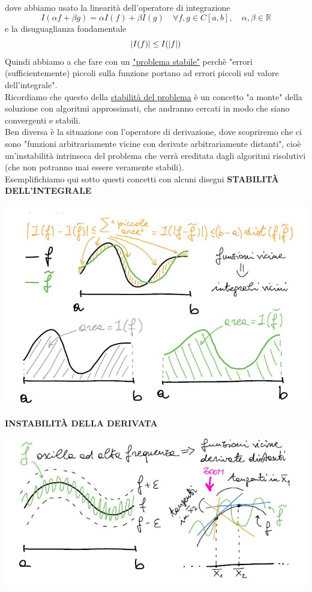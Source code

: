 \documentclass[12pt,a4paper]{article}
\DeclarePairedDelimiter{\abs}{\lvert}{\rvert}
\begin{document}
dove abbiamo usato la linearità dell'operatore di integrazione
\begin{equation*}
        I(\alpha f+\beta g)=\alpha I(f)+\beta I(g)\quad \forall f,g\in C[a,b],\quad \alpha,\beta\in\mathbb{R}
\end{equation*}
e la disuguaglianza fondamentale
\begin{equation*}
    \abs*{I(f)} \leq I(\abs*{f})
\end{equation*}
Quindi abbiamo a che fare con un \underline{"problema stabile"} perchè "errori (sufficientemente) piccoli sulla funzione portano ad errori piccoli sul valore dell'integrale".\\
Ricordiamo che questo della \underline{stabilità del problema} è un concetto "a monte" della soluzione con algoritmi approssimati, che andranno cercati in modo che siano convergenti e stabili. \\Ben diversa è la situazione con l'operatore di derivazione, dove scopriremo che ci sono "funzioni arbitrariamente vicine con derivate arbitrariamente distanti", cioè un'instabilità intrinseca del problema che verrà ereditata dagli algoritmi risolutivi (che non potranno mai essere veramente stabili).\\ Esemplifichiamo  qui sotto questi concetti con alcuni disegni 
\newline \newline
\textbf{STABILITÀ DELL'INTEGRALE}
\begin{center}
    \includegraphics[scale=0.6]{calcolo5.JPG}
\end{center}
\textbf{INSTABILITÀ DELLA DERIVATA}
\begin{center}
    \includegraphics[scale=0.6]{calcolo55.JPG}
\end{center}
\end{document}
